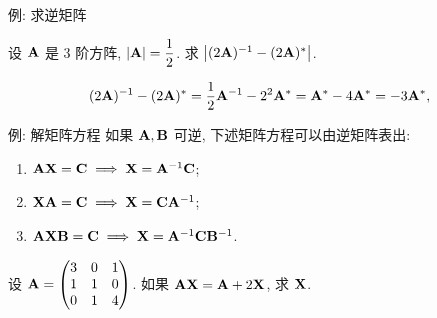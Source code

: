 \begin{frame}{例: 求逆矩阵}
	\onslide<+->
	\begin{example}
		设 ${\mathbf{A}}$ 是 $3$ 阶方阵, $|{\mathbf{A}}|=\dfrac12$.
		求 $\bigl|(2{\mathbf{A}})^{-1}-(2{\mathbf{A}})^*\bigr|$.
	\end{example}
	\onslide<+->
	\begin{solution}
		\[(2{\mathbf{A}})^{-1}-(2{\mathbf{A}})^*
		=\frac12{\mathbf{A}}^{-1}-2^2{\mathbf{A}}^*={\mathbf{A}}^*-4{\mathbf{A}}^*=-3{\mathbf{A}}^*,\]
		\onslide<+->{因此
		\[\bigl|(2\bfA)^{-1}-(2\bfA)^*\bigr|=-27|\bfA^*|=-27|\bfA|^2=-\frac{27}4.\]
		}
		\vspace{-\baselineskip}
	\end{solution}
\end{frame}


\begin{frame}{例: 解矩阵方程}
	\onslide<+->
	如果 ${\mathbf{A}},{\mathbf{B}}$ 可逆, 下述矩阵方程可以由逆矩阵表出:
	\begin{enumerate}
		\item ${\mathbf{A}}{\mathbf{X}}={\mathbf{C}}\implies {\mathbf{X}}={\mathbf{A}}^{-1}{\mathbf{C}}$;
		\item ${\mathbf{X}}{\mathbf{A}}={\mathbf{C}}\implies {\mathbf{X}}={\mathbf{C}}{\mathbf{A}}^{-1}$;
		\item ${\mathbf{A}}{\mathbf{X}}{\mathbf{B}}={\mathbf{C}}\implies {\mathbf{X}}={\mathbf{A}}^{-1}{\mathbf{C}}{\mathbf{B}}^{-1}$.
	\end{enumerate}
	\onslide<+->
	\begin{example}
		设 ${\mathbf{A}}=\begin{pmatrix}
			3&0&1\\1&1&0\\0&1&4
		\end{pmatrix}$. 如果 ${\mathbf{A}}{\mathbf{X}}={\mathbf{A}}+2{\mathbf{X}}$, 求 ${\mathbf{X}}$.
	\end{example}
\end{frame}


